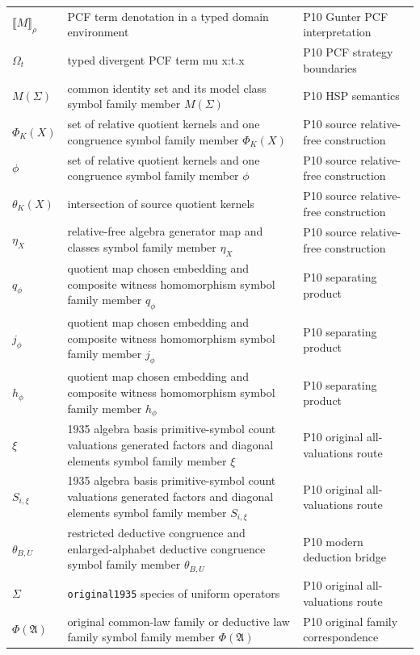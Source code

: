 \begin{longtable}{@{}p{}p{}p{}@{}}
\(\llbracket M\rrbracket_\rho\) & PCF term denotation in a typed domain environment & P10 Gunter PCF interpretation \\
\(\Omega_t\) & typed divergent PCF term mu x:t.x & P10 PCF strategy boundaries \\
\(M(\Sigma)\) & common identity set and its model class symbol family member \(M(\Sigma)\) & P10 HSP semantics \\
\(\Phi_K(X)\) & set of relative quotient kernels and one congruence symbol family member \(\Phi_K(X)\) & P10 source relative-\allowbreak{}free construction \\
\(\phi\) & set of relative quotient kernels and one congruence symbol family member \(\phi\) & P10 source relative-\allowbreak{}free construction \\
\(\theta_K(X)\) & intersection of source quotient kernels & P10 source relative-\allowbreak{}free construction \\
\(\eta_X\) & relative-free algebra generator map and classes symbol family member \(\eta_X\) & P10 source relative-\allowbreak{}free construction \\
\(q_\phi\) & quotient map chosen embedding and composite witness homomorphism symbol family member \(q_\phi\) & P10 separating product \\
\(j_\phi\) & quotient map chosen embedding and composite witness homomorphism symbol family member \(j_\phi\) & P10 separating product \\
\(h_\phi\) & quotient map chosen embedding and composite witness homomorphism symbol family member \(h_\phi\) & P10 separating product \\
\(\xi\) & 1935 algebra basis primitive-symbol count valuations generated factors and diagonal elements symbol family member \(\xi\) & P10 original all-\allowbreak{}valuations route \\
\(S_{i,\xi}\) & 1935 algebra basis primitive-symbol count valuations generated factors and diagonal elements symbol family member \(S_{i,\xi}\) & P10 original all-\allowbreak{}valuations route \\
\(\theta_{B,U}\) & restricted deductive congruence and enlarged-alphabet deductive congruence symbol family member \(\theta_{B,U}\) & P10 modern deduction bridge \\
\(\Sigma\) & \texttt{original1935} species of uniform operators & P10 original all-\allowbreak{}valuations route \\
\(\Phi(\mathfrak A)\) & original common-law family or deductive law family symbol family member \(\Phi(\mathfrak A)\) & P10 original family correspondence \\

\end{longtable}
